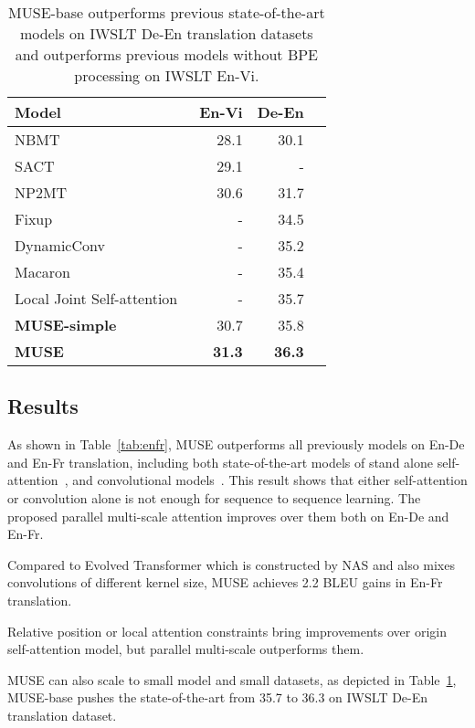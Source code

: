 \documentclass{article} \usepackage{iclr2020_conference,times}
\begin{document}
\begin{table}[t]
\centering
\begin{tabular}{lrrr}
\toprule
Model  & En-Vi & De-En  \\
\midrule
NBMT~\citep{NBMT} & 28.1 & 30.1  \\
SACT~\citep{SACT} & 29.1 &-  \\
NP2MT~\citep{feng2018neural} &30.6 & 31.7 \\ Fixup~\citep{zhang2019fixup}  & -  & 34.5\\
DynamicConv~\citep{wu2019pay}  & - & 35.2 \\
Macaron~\citep{lu2019understanding}  & - &35.4 \\ 
Local Joint Self-attention~\citep{fonollosa2019joint}  &- &35.7 \\
\midrule
\textbf{MUSE-simple} & 30.7 & 35.8 \\
\textbf{MUSE} &\textbf{31.3} &\textbf{36.3}\\
\bottomrule
\end{tabular}
\caption{MUSE-base outperforms previous state-of-the-art models on IWSLT  De-En translation datasets and outperforms previous models without BPE processing on IWSLT  En-Vi. }
\label{tab:mtsmall}
\end{table}


\subsection{Results}


As shown in Table~\ref{tab:enfr}, MUSE outperforms all previously  models on En-De and En-Fr translation, including both  state-of-the-art models of stand alone self-attention~\citep{vaswani2017attention,ott2018scaling}, and convolutional models~\citep{gehring2017convolutional,kaiser2017depthwise,wu2019pay}. This result shows that either self-attention or convolution alone is not enough for sequence to sequence learning. The proposed parallel multi-scale attention improves over them both on En-De and En-Fr.

Compared to Evolved Transformer \citep{so2019evolved} which is constructed by NAS and also mixes convolutions of different kernel size, MUSE achieves 2.2 BLEU gains in En-Fr translation.

Relative position or local attention constraints bring improvements over origin self-attention model, but parallel multi-scale outperforms them.

MUSE can also scale to small model and small datasets, as depicted in Table~\ref{tab:mtsmall}, MUSE-base pushes the state-of-the-art from 35.7 to 36.3 on IWSLT De-En translation dataset.
\end{document}
